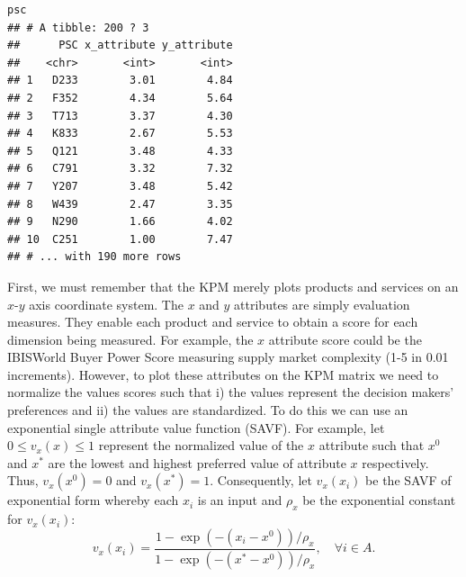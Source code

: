 \documentclass[twocolumn]{svjour3}       %
\begin{document}
\begin{verbatim}
psc
## # A tibble: 200 ? 3
##      PSC x_attribute y_attribute
##    <chr>       <int>       <int>
## 1   D233        3.01        4.84
## 2   F352        4.34        5.64
## 3   T713        3.37        4.30
## 4   K833        2.67        5.53
## 5   Q121        3.48        4.33
## 6   C791        3.32        7.32
## 7   Y207        3.48        5.42
## 8   W439        2.47        3.35
## 9   N290        1.66        4.02
## 10  C251        1.00        7.47
## # ... with 190 more rows
\end{verbatim}

First, we must remember that the KPM merely plots products and services on an $x$-$y$ axis coordinate system.  The $x$ and $y$ attributes are simply evaluation measures. They enable each product and service to obtain a score for each dimension being measured. For example, the $x$ attribute score could be the IBISWorld Buyer Power Score measuring supply market complexity (1-5 in 0.01 increments). However, to plot these attributes on the KPM matrix we need to normalize the values scores such that i) the values represent the decision makers' preferences and ii) the values are standardized. To do this we can use an exponential single attribute value function (SAVF). For example, let $0 \le v_x\left(x\right) \le 1$ represent the normalized value of the $x$ attribute such that $x^0$ and $x^*$ are the lowest and highest preferred value of attribute $x$ respectively. Thus, $v_x\left(x^0\right) = 0$ and $v_x\left(x^*\right) = 1$. Consequently, let $v_x\left(x_i\right)$ be the SAVF of exponential form whereby each $x_i$ is an input and $\rho_x$ be the exponential constant for $v_x\left(x_i\right)$:
\begin{equation}
\label{eqn:1}
v_x\left(x_i\right) = \frac{1 - \exp\left(-\left(x_i - x^0\right)\right) / \rho_x}{1 - \exp\left(-\left(x^* - x^0\right)\right) / \rho_x}, \quad \forall i \in A.
\end{equation}
\end{document}
